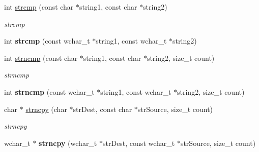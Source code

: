 \begin{DoxyCompactItemize}
\item 
\hypertarget{namespacestring__util_a791b8d128151f4485bf887bf438b691f}{int \hyperlink{namespacestring__util_a791b8d128151f4485bf887bf438b691f}{strcmp} (const char $\ast$string1, const char $\ast$string2)}\label{namespacestring__util_a791b8d128151f4485bf887bf438b691f}

\begin{DoxyCompactList}\small\item\em strcmp \end{DoxyCompactList}\item 
\hypertarget{namespacestring__util_ac56913f0992f2e3873742dfed7a3a139}{int {\bfseries strcmp} (const wchar\-\_\-t $\ast$string1, const wchar\-\_\-t $\ast$string2)}\label{namespacestring__util_ac56913f0992f2e3873742dfed7a3a139}

\item 
\hypertarget{namespacestring__util_ae5007e89fd173108517cd5d6b0b9366c}{int \hyperlink{namespacestring__util_ae5007e89fd173108517cd5d6b0b9366c}{strncmp} (const char $\ast$string1, const char $\ast$string2, size\-\_\-t count)}\label{namespacestring__util_ae5007e89fd173108517cd5d6b0b9366c}

\begin{DoxyCompactList}\small\item\em strncmp \end{DoxyCompactList}\item 
\hypertarget{namespacestring__util_a228b9144a3fca764257878d37ac774a3}{int {\bfseries strncmp} (const wchar\-\_\-t $\ast$string1, const wchar\-\_\-t $\ast$string2, size\-\_\-t count)}\label{namespacestring__util_a228b9144a3fca764257878d37ac774a3}

\item 
\hypertarget{namespacestring__util_a955d4ceed010c00aa6b32eadface6558}{char $\ast$ \hyperlink{namespacestring__util_a955d4ceed010c00aa6b32eadface6558}{strncpy} (char $\ast$str\-Dest, const char $\ast$str\-Source, size\-\_\-t count)}\label{namespacestring__util_a955d4ceed010c00aa6b32eadface6558}

\begin{DoxyCompactList}\small\item\em strncpy \end{DoxyCompactList}\item 
\hypertarget{namespacestring__util_a5c7719a68a6781593c89931225aaf73a}{wchar\-\_\-t $\ast$ {\bfseries strncpy} (wchar\-\_\-t $\ast$str\-Dest, const wchar\-\_\-t $\ast$str\-Source, size\-\_\-t count)}\label{namespacestring__util_a5c7719a68a6781593c89931225aaf73a}


\end{DoxyCompactItemize}
